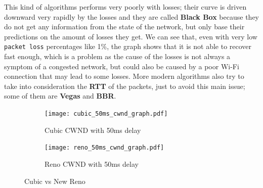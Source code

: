 \documentclass{exam}
\begin{document}
This kind of algorithms performs very poorly with losses; their curve is driven downward very rapidly by the losses and they are called \textbf{Black Box} because they do not get any information from the state of the network, but only base their predictions on the amount of losses they get. We can see that, even with very low \texttt{packet loss} percentages like 1\%, the graph shows that it is not able to recover fast enough, which is a problem as the cause of the losses is not always a symptom of a congested network, but could also be caused by a poor Wi-Fi connection that may lead to some losses. More modern algorithms also try to take into consideration the \textbf{RTT} of the packets, just to avoid this main issue; some of them are \textbf{Vegas} and \textbf{BBR}.
\begin{figure}[H]
    \centering
    \begin{subfigure}{0.45\textwidth}
        \centering
        \texttt{[image: cubic\_50ms\_cwnd\_graph.pdf]}  
        \caption{Cubic CWND with 50ms delay}
    \end{subfigure}
    \hfill
    \begin{subfigure}{0.45\textwidth}
        \centering
        \texttt{[image: reno\_50ms\_cwnd\_graph.pdf]}
        \caption{Reno CWND with 50ms delay}
    \end{subfigure}
    \caption{Cubic vs New Reno}
    \label{fig:cubic-vs-reno}
\end{figure}
\end{document}
